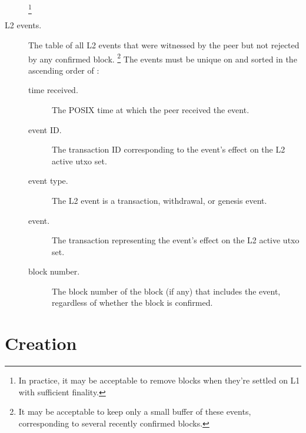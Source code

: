 \documentclass[../hydrozoa.tex]{subfiles}
\begin{document}
\begin{description}
    \footnote{In practice, it may be acceptable to remove blocks when they're settled on L1 with sufficient finality.}
  \item[L2 events.] The table of all L2 events that were witnessed by the peer but not rejected by any confirmed block.%
    \footnote{It may be acceptable to keep only a small buffer of these events, corresponding to several recently confirmed blocks.}
    The events must be unique on  and sorted in the ascending order of :
    \begin{description}
      \item[time received.] The POSIX time at which the peer received the event.
      \item[event ID.] The transaction ID corresponding to the event's effect on the L2 active utxo set.
      \item[event type.] The L2 event is a transaction, withdrawal, or genesis event.
      \item[event.] The transaction representing the event's effect on the L2 active utxo set.
      \item[block number.] The block number of the block (if any) that includes the event, regardless of whether the block is confirmed.
    \end{description}
\end{description}

\section{Creation}%
\label{h:l2-block-creation}%
\end{document}
